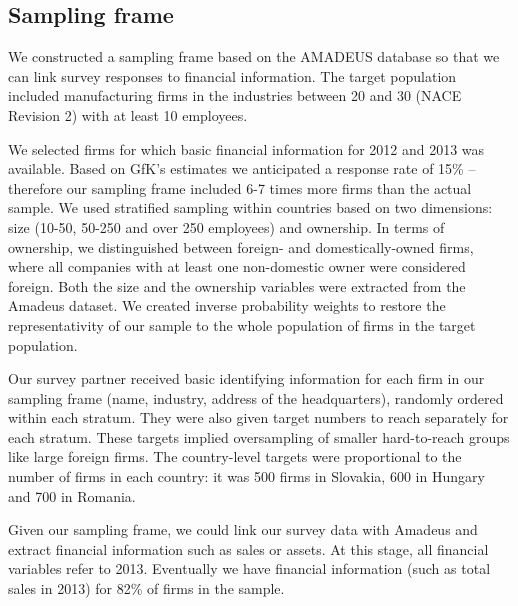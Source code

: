 \documentclass[final, dvipsnames, authoryear,12pt]{elsarticle}
\begin{document}

\subsection{Sampling frame}

We constructed a sampling frame based on the AMADEUS database \citep{amadeus} so that we can link survey responses to financial information. The target population included manufacturing firms in the industries between 20 and 30 (NACE Revision 2) with at least 10 employees.

We selected firms for which basic financial information for 2012 and 2013 was available. Based on GfK's estimates we anticipated a response rate of 15\% -- therefore our sampling frame included 6-7 times more firms than the actual sample. We used stratified sampling within countries based on two dimensions: size (10-50, 50-250 and over 250 employees) and ownership. In terms of ownership, we distinguished between foreign- and domestically-owned firms, where all companies with at least one non-domestic owner were considered  foreign. Both the size and the ownership variables were extracted from the Amadeus dataset. We created inverse probability weights to restore the representativity of our sample to the whole population of firms in the target population.

Our survey partner received basic identifying information for each firm in our sampling frame (name, industry, address of the headquarters), randomly ordered within each stratum. They were also given target numbers to reach separately for each stratum. These targets implied oversampling of smaller hard-to-reach groups like large foreign firms. The country-level targets were proportional to the number of firms in each country:  it was 500 firms in Slovakia, 600 in Hungary and 700 in Romania.



Given our sampling frame, we could link our survey data with Amadeus and extract financial information such as sales or assets. At this stage, all financial variables refer to 2013. Eventually we have financial information (such as total sales in 2013) for 82\% of firms in the sample. 
\end{document}
